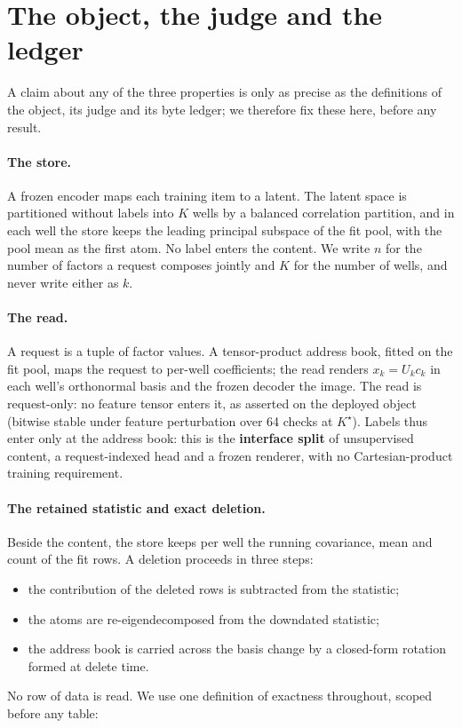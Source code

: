 \documentclass{article} %
\newcommand{\Kstar}{\ensuremath{K^{\star}}}
\begin{document}
\section{The object, the judge and the ledger}
\label{sec:object}

A claim about any of the three properties is only as precise as the definitions of the object,
its judge and its byte ledger; we therefore fix these here, before any result.

\paragraph{The store.} A frozen encoder maps each training item to a latent. The latent
space is partitioned without labels into $K$ wells by a balanced correlation partition, and in
each well the store keeps the leading principal subspace of the fit pool, with the pool mean as
the first atom. No label enters the content. We write $n$ for the number of factors a request
composes jointly and $K$ for the number of wells, and never write either as $k$.

\paragraph{The read.} A request is a tuple of factor values. A tensor-product address book,
fitted on the fit pool, maps the request to per-well coefficients; the read renders
$x_k=U_k c_k$ in each well's orthonormal basis and the frozen decoder the image.
The read is request-only: no feature tensor enters it, as asserted on the deployed object
(bitwise stable under feature perturbation over 64 checks at $\Kstar$).
Labels thus enter only at the address book: this is the \textbf{interface split} of unsupervised content, a request-indexed head and a frozen renderer, with no
Cartesian-product training requirement.

\paragraph{The retained statistic and exact deletion.} Beside the content, the store keeps per well the running covariance, mean and count of the fit rows. A deletion proceeds in
three steps:
\begin{itemize}[leftmargin=*,nosep]
\item the contribution of the deleted rows is subtracted from the statistic;
\item the atoms are re-eigendecomposed from the downdated statistic;
\item the address book is carried across the basis change by a closed-form rotation formed at
  delete time.
\end{itemize}
No row of data is read. We use one definition of exactness throughout, scoped before any table:
\end{document}
